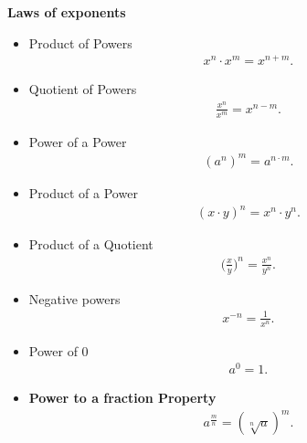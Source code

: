 \documentclass{report}
\begin{document}
      \pagebreak \bigbreak \noindent
      \begin{mdframed}
        \textbf{Laws of exponents}
          \begin{itemize}
            \item Product of Powers
                \begin{align*}
                    x^{n} \cdot x^{m} = x^{n+m}
                .\end{align*}
            \item Quotient of Powers
                \begin{align*}
                    \frac{x^{n}}{x^{m}} = x^{n-m}
                .\end{align*}
            \item Power of a Power
                \begin{align*}
                    (a^{n})^{m} = a^{n \cdot m}
                .\end{align*}
            \item Product of a Power
                \begin{align*}
                    (x \cdot y)^{n} = x^{n} \cdot y^{n}
                .\end{align*}
            \item Product of a Quotient
                \begin{align*}
                    \bigg(\frac{x}{y}\bigg)^{n} = \frac{x^{n}}{y^{n}}
                .\end{align*}
            \item Negative powers
              \begin{align*}
                x^{-n} = \frac{1}{x^{n}}
              .\end{align*}
            \item Power of 0
              \begin{align*}
                a^{0} = 1
              .\end{align*}
            \item \textbf{Power to a fraction Property}
            \begin{align*}
              a^{\frac{m}{n}} = (\sqrt[n]{a})^{m}
            .\end{align*}
          \end{itemize}
      \end{mdframed}
      \bigbreak \noindent 
\end{document}
